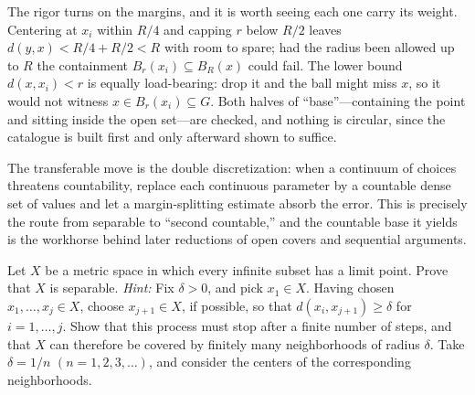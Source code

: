 \documentclass[main.tex]{subfiles}
\begin{document}
\begin{Reflection}
The rigor turns on the margins, and it is worth seeing each one carry its weight. Centering at $x_i$
within $R/4$ and capping $r$ below $R/2$ leaves $d(y,x)<R/4+R/2<R$ with room to spare; had the radius
been allowed up to $R$ the containment $B_r(x_i)\subseteq B_R(x)$ could fail. The lower bound
$d(x,x_i)<r$ is equally load-bearing: drop it and the ball might miss $x$, so it would not witness
$x\in B_r(x_i)\subseteq G$. Both halves of ``base''---containing the point and sitting inside the open
set---are checked, and nothing is circular, since the catalogue is built first and only afterward
shown to suffice.

The transferable move is the double discretization: when a continuum of choices threatens countability,
replace each continuous parameter by a countable dense set of values and let a margin-splitting
estimate absorb the error. This is precisely the route from separable to ``second countable,'' and the
countable base it yields is the workhorse behind later reductions of open covers and sequential
arguments.
\end{Reflection}

Let $X$ be a metric space in which every infinite subset has a limit point. Prove that $X$ is
separable. \emph{Hint:} Fix $\delta>0$, and pick $x_1\in X$. Having chosen $x_1,\dots,x_j\in X$, choose
$x_{j+1}\in X$, if possible, so that $d(x_i,x_{j+1})\ge\delta$ for $i=1,\dots,j$. Show that this
process must stop after a finite number of steps, and that $X$ can therefore be covered by finitely
many neighborhoods of radius $\delta$. Take $\delta=1/n$ $(n=1,2,3,\dots)$, and consider the centers of
the corresponding neighborhoods.
\end{document}
